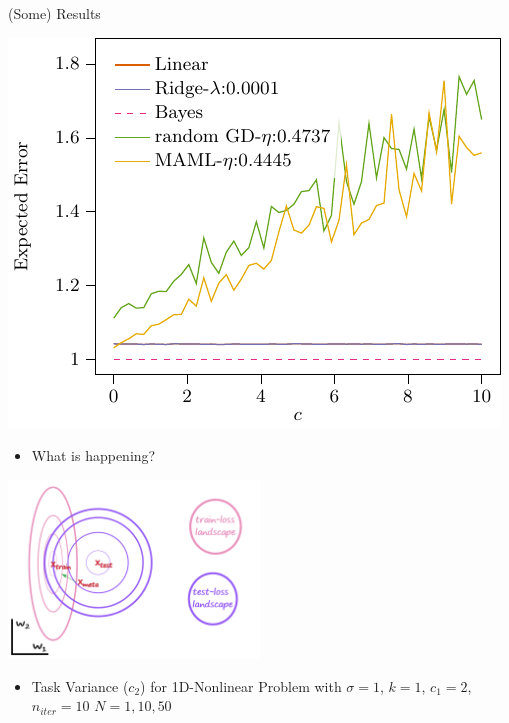 \documentclass[aspectratio=169]{beamer}
\begin{document}
\begin{frame}{(Some) Results}
{\begin{minipage}{0.3\textwidth}
    \end{minipage}%
    \begin{minipage}{0.3\textwidth}
      \includegraphics[width=\textwidth]{figures/lin_c_3}    
    \end{minipage}
  }
  {
    \begin{itemize}
      \item What is happening?
    \end{itemize}
    \centering
    \includegraphics[width=0.5\textwidth]{figures/testvstrain}
  }
  {
    \begin{itemize}
      \item Task Variance ($c_2$) for 1D-Nonlinear Problem with $\sigma = 1$,
        $k = 1$, $c_1 = 2$, $n_{iter} = 10$ $N=1, 10, 50$ %
        

\end{itemize}}
\end{frame}
\end{document}

